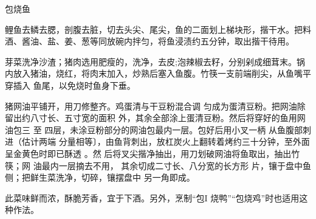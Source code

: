 \begin{recipe}{包烧鱼}

\ingredients


\preparation

\step 鲤鱼去鳞去腮，剖腹去脏，切去头尖、尾尖，鱼的二面划上梯块形，揩干水。把料
酒、酱油、盐、姜、葱等同放碗内拌匀，将鱼浸渍约五分钟，取出揩干待用。

\step 芽菜洗净沙渣；猪肉选用肥瘦的，洗净，去皮;泡辣椒去籽，分别剁成细茸末。锅
内放入猪油，烧红，将肉末加入，炒熟后塞入鱼腹。竹筷一支前端削尖，从鱼嘴平穿插入
鱼尾，以免烧时鱼身下垂。

\step 猪网油平铺开，用刀修整齐。鸡蛋清与干豆粉混合调 匀成为蛋清豆粉。把网油除
留出约八寸长、五寸宽的面积 外，其余全部涂上蛋清豆粉。然后将穿好的鱼用网油包三
至 四层，未涂豆粉部分的网油包最内一层。包好后用小叉一柄 从鱼腹部刺进（估计两端
分量相等〕，由鱼背刺出，放杠炭火上翻转着烤约三十分钟，至外面呈金黄色时即已酥透
。然 后将叉尖揩净抽出，用刀划破网油将鱼取出，抽出竹筷；网 油最内一层摘去不用，
其余切成二寸长、八分宽的长方形 片，镶于盘中鱼侧；把鲜生菜洗净，切碎，镶摆盘中
另一角即成。

\features

此菜味鲜而浓，酥脆芳香，宜于下酒。另外，烹制“包I 烧鸭”“包烧鸡”时也适用这种作法。

\end{recipe}

